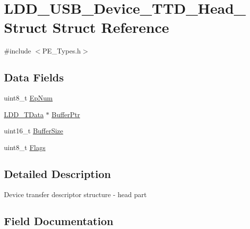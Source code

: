 \hypertarget{struct_l_d_d___u_s_b___device___t_t_d___head___struct}{}\section{L\+D\+D\+\_\+\+U\+S\+B\+\_\+\+Device\+\_\+\+T\+T\+D\+\_\+\+Head\+\_\+\+Struct Struct Reference}
\label{struct_l_d_d___u_s_b___device___t_t_d___head___struct}


{\ttfamily \#include $<$P\+E\+\_\+\+Types.\+h$>$}

\subsection*{Data Fields}
\begin{DoxyCompactItemize}
\item 
uint8\+\_\+t \hyperlink{struct_l_d_d___u_s_b___device___t_t_d___head___struct_ab3874883985b845f4e4be39240793543}{Ep\+Num}
\item 
\hyperlink{group___p_e___types__module_gade8ef9401405bd941b6da738b807f980}{L\+D\+D\+\_\+\+T\+Data} $\ast$ \hyperlink{struct_l_d_d___u_s_b___device___t_t_d___head___struct_aa1830a973aab07b39899cf4435b8aa26}{Buffer\+Ptr}
\item 
uint16\+\_\+t \hyperlink{struct_l_d_d___u_s_b___device___t_t_d___head___struct_ad04ab3cfb7cab97abbba9dfc3c43f1a0}{Buffer\+Size}
\item 
uint8\+\_\+t \hyperlink{struct_l_d_d___u_s_b___device___t_t_d___head___struct_a9572bb866ff1f22ed881f3ff618c0445}{Flags}
\end{DoxyCompactItemize}


\subsection{Detailed Description}
Device transfer descriptor structure -\/ head part 

\subsection{Field Documentation}
\hypertarget{struct_l_d_d___u_s_b___device___t_t_d___head___struct_aa1830a973aab07b39899cf4435b8aa26}{}
